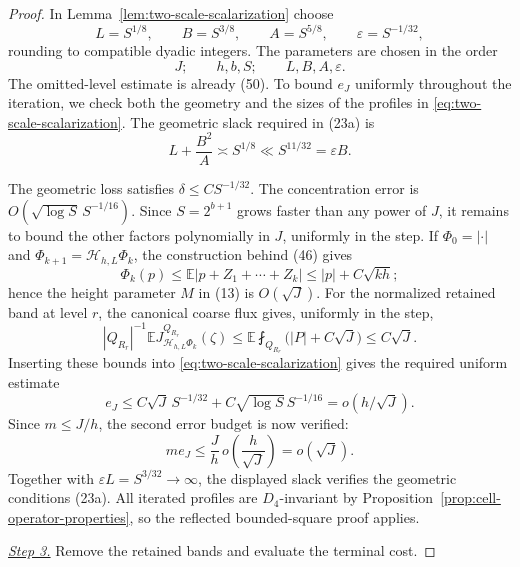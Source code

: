 \documentclass{smfart}
\theoremstyle{definition}
\newcommand{\1}{\mathbf 1}
\begin{document}
\begin{proof}
In Lemma~\ref{lem:two-scale-scalarization} choose
\begin{equation}
L=S^{1/8},\qquad B=S^{3/8},\qquad A=S^{5/8},
\qquad\varepsilon=S^{-1/32},
\tag{51}
\end{equation}
rounding to compatible dyadic integers.  The parameters are chosen in
the order
\[
J;\qquad h,b,S;\qquad L,B,A,\varepsilon.
\]
The omitted-level estimate is already (50).  To bound $e_J$ uniformly
throughout the iteration, we check both the geometry and the sizes of
the profiles in \eqref{eq:two-scale-scalarization}.  The geometric
slack required in (23a) is
\begin{equation*}
L+\frac{B^2}{A}\asymp S^{1/8}
\ll S^{11/32}=\varepsilon B.
\end{equation*}

The geometric loss satisfies $\delta\leq CS^{-1/32}$.
The concentration error is $O(\sqrt{\log S}\,S^{-1/16})$.
Since $S=2^{b+1}$ grows faster than any power of $J$, it remains to
bound the other factors polynomially in $J$, uniformly in the step.
If
$\Phi_ 0=|\cdot|$ and
$\Phi_ {k+1}=\mathcal H_ {h,L}\Phi_ k$, the construction behind (46)
gives
\begin{equation}
\Phi_ k(p)\leq\mathbb E|p+Z_ 1+\cdots+Z_ k|
\leq |p|+C\sqrt{kh};
\tag{52}
\end{equation}
hence the height parameter $M$ in (13) is $O(\sqrt J)$.
For the normalized retained band at level $r$, the canonical coarse flux
gives, uniformly in the step,
\begin{equation}
|Q_{R_r}|^{-1}\mathbb EJ_ {\mathcal H_ {h,L}\Phi_ k}^{Q_{R_r}}(\zeta)
\leq\mathbb E\fint_{Q_{R_r}}\bigl(|P|+C\sqrt J\bigr)\leq C\sqrt J.
\tag{52a}
\end{equation}
Inserting these bounds into \eqref{eq:two-scale-scalarization} gives
the required uniform estimate
\begin{equation}
e_ J\leq C\sqrt J\,S^{-1/32}
+C\sqrt{\log S}\,S^{-1/16}=o(h/\sqrt J).
\tag{52b}
\end{equation}
Since $m\leq J/h$, the second error budget is now verified:
\begin{equation*}
m e_J\leq\frac{J}{h}\,
o\!\left(\frac{h}{\sqrt J}\right)=o(\sqrt J).
\end{equation*}
Together with $\varepsilon L=S^{3/32}\to\infty$, the displayed slack
verifies the geometric conditions (23a).
All iterated profiles are $D_ 4$-invariant by Proposition~\ref{prop:cell-operator-properties}, so the reflected bounded-square proof applies.

\smallskip\noindent
\underline{\textit{Step 3.}} Remove the retained bands and evaluate the terminal cost.


\end{proof}
\end{document}
